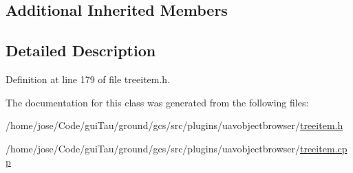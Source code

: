 \subsection*{Additional Inherited Members}


\subsection{Detailed Description}


Definition at line 179 of file treeitem.\-h.



The documentation for this class was generated from the following files\-:\begin{DoxyCompactItemize}
\item 
/home/jose/\-Code/gui\-Tau/ground/gcs/src/plugins/uavobjectbrowser/\hyperlink{treeitem_8h}{treeitem.\-h}\item 
/home/jose/\-Code/gui\-Tau/ground/gcs/src/plugins/uavobjectbrowser/\hyperlink{treeitem_8cpp}{treeitem.\-cpp}\end{DoxyCompactItemize}
